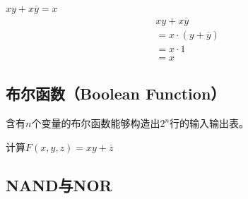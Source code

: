 \documentclass[12pt, openany, oneside]{book}
\begin{document}
\begin{tcolorbox}
	$ xy + x \overline y = x $
	\begin{align}
		 & xy + x \overline y          \\
		 & = x \cdot (y + \overline y) \\
		 & = x \cdot 1                 \\
		 & = x
	\end{align}
\end{tcolorbox}

\subsection{布尔函数（Boolean Function）}

含有$ n $个变量的布尔函数能够构造出$ 2^n $行的输入输出表。

\begin{tcolorbox}
	计算$ F(x, y, z) = xy + \overline z $
	\begin{table}[H]
		\centering
	\end{table}
\end{tcolorbox}

\subsection{NAND与NOR}
\end{document}
